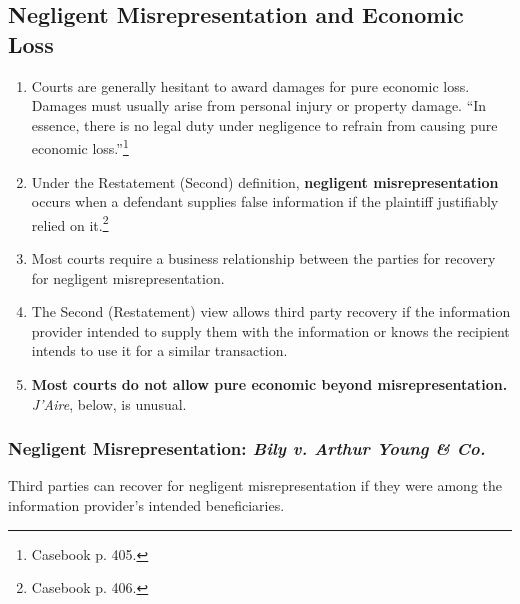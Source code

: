 \subsection{Negligent Misrepresentation and Economic Loss}

\begin{enumerate}
    \item Courts are generally hesitant to award damages for pure economic 
    loss. Damages must usually arise from personal injury or property damage. 
    ``In essence, there is no legal duty under negligence to refrain from 
    causing pure economic loss.''\footnote{Casebook p. 405.}
    \item Under the Restatement (Second) definition, \textbf{negligent 
    misrepresentation} occurs when a defendant supplies false information if 
    the plaintiff justifiably relied on it.\footnote{Casebook p. 406.}
    \item Most courts require a business relationship between the parties for 
    recovery for negligent misrepresentation.
    \item The Second (Restatement) view allows third party recovery if the 
    information provider intended to supply them with the information or knows 
    the recipient intends to use it for a similar transaction.
    \item \textbf{Most courts do not allow pure economic beyond misrepresentation.} 
    \emph{J'Aire}, below, is unusual.
\end{enumerate}

\subsubsection{Negligent Misrepresentation: \emph{Bily v. Arthur Young \& 
Co.}}

Third parties can recover for negligent misrepresentation if they were among 
the information provider's intended beneficiaries.

